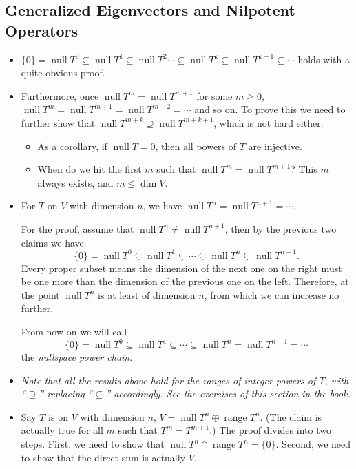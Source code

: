 \documentclass{article}
\newcommand{\n}{\operatorname{null}}
\renewcommand{\r}{\operatorname{range}}
\renewcommand{\d}{\dim}
\begin{document}
\subsection{Generalized Eigenvectors and Nilpotent Operators}
\begin{itemize}
    \item $\{0\} = \n T^0 \subseteq \n T^1 \subseteq \n T^2 \cdots \subseteq \n T^k \subseteq \n T^{k+1} \subseteq \cdots$ holds with a quite obvious proof.
        \item Furthermore, once $\n T^m = \n T^{m+1}$ for some $m \geq 0$, $\n T^m = \n T^{m+1} = \n T^{m+2} = \cdots$ and so on. To prove this we need to further show that $\n T^{m+k} \supseteq \n T^{m+k+1}$, which is not hard either.
        \begin{itemize}
            \item As a corollary, if $\n T = {0}$, then all powers of $T$ are injective.
            \item When do we hit the first $m$ such that $\n T^m = \n T^{m+1}$? This $m$ always exists, and $m \leq \d V$.
        \end{itemize}
    \item For $T$ on $V$ with dimension $n$, we have $\n T^n = \n T^{n+1} = \cdots$.
    
    For the proof, assume that $\n T^n \ne \n T^{n+1}$, then by the previous two claims we have
    $$\{0\} = \n T^0 \subsetneq \n T^1 \subsetneq \cdots \subsetneq \n T^n \subsetneq \n T^{n+1}.$$
    Every proper subset means the dimension of the next one on the right must be one more than the dimension of the previous one on the left. Therefore, at the point $\n T^n$ is at least of dimension $n$, from which we can increase no further.
    
    From now on we will call $$\{0\} = \n T^0 \subseteq \n T^1 \subseteq \cdots \subseteq \n T^n = \n T^{n+1} = \cdots$$ the \emph{nullspace power chain}.
    
    \item \emph{Note that all the results above hold for the ranges of integer powers of $T$, with ``$\supseteq$'' replacing ``$\subseteq$'' accordingly. See the exercises of this section in the book.}
    \item Say $T$ is on $V$ with dimension $n$, $V = \n T^n \oplus \r T^n$. (The claim is actually true for all $m$ such that $T^m = T^{m+1}$.)
    The proof divides into two steps. First, we need to show that $\n T^n \cap \r T^n = \{0\}$. Second, we need to show that the direct sum is actually $V$.
    

\end{itemize}
\end{document}
